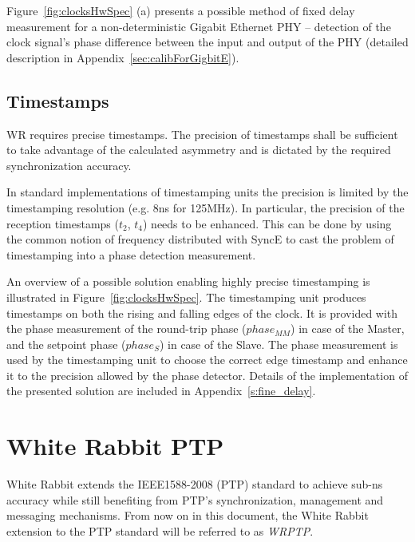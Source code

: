 \documentclass[a4paper, 12pt]{article}
\begin{document}
Figure~\ref{fig:clocksHwSpec} (a) presents a possible method of fixed delay measurement for a 
non-deterministic Gigabit Ethernet PHY -- detection of the clock signal's phase difference between 
the input and output of the PHY (detailed description in Appendix~\ref{sec:calibForGigbitE}). 


\subsection{Timestamps}
\label{sec:timestamps}

WR requires precise timestamps. 
The precision of timestamps shall be sufficient to take advantage of the calculated asymmetry
and is dictated by the required synchronization accuracy. 

In standard implementations of timestamping units the precision is limited by 
the timestamping resolution (e.g. 8ns for 125MHz). 
In particular, the precision of the reception timestamps ($t_2$, $t_4$) needs to be enhanced. 
This can be done by using the common notion of frequency distributed with SyncE to cast the 
problem of timestamping into a phase detection measurement.

An overview of a possible solution enabling highly precise timestamping is illustrated in 
Figure~\ref{fig:clocksHwSpec}. The timestamping unit produces timestamps on both the rising 
and falling edges of the clock. It is provided with the phase measurement of the round-trip phase 
($phase_{MM}$) in case of the Master, and the setpoint phase ($phase_{S}$) in case of the Slave. 
The phase measurement is used by the timestamping unit to choose the correct edge timestamp and 
enhance it to the precision allowed by the phase detector. 
Details of the implementation of the presented solution are included in Appendix~\ref{s:fine_delay}.




\newpage

\section{White Rabbit PTP }


White Rabbit extends the IEEE1588-2008 (PTP) standard to achieve sub-ns accuracy while still 
benefiting from PTP's synchronization, management and messaging mechanisms. From now on in this
document, the White Rabbit extension to the PTP standard will be referred to as \textit{WRPTP}.
\end{document}
